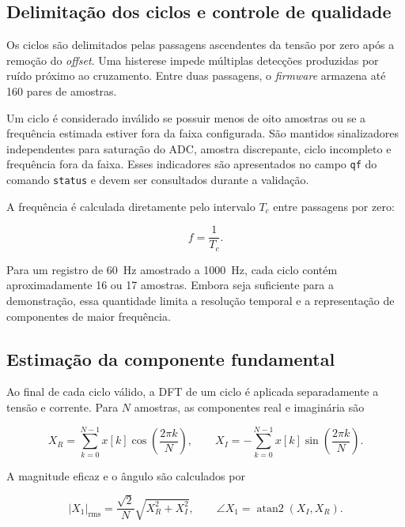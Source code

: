 \subsection{Delimitação dos ciclos e controle de qualidade}

Os ciclos são delimitados pelas passagens ascendentes da tensão por zero após a remoção do \textit{offset}. Uma histerese impede múltiplas detecções produzidas por ruído próximo ao cruzamento. Entre duas passagens, o \textit{firmware} armazena até 160 pares de amostras.

Um ciclo é considerado inválido se possuir menos de oito amostras ou se a frequência estimada estiver fora da faixa configurada. São mantidos sinalizadores independentes para saturação do ADC, amostra discrepante, ciclo incompleto e frequência fora da faixa. Esses indicadores são apresentados no campo \texttt{qf} do comando \texttt{status} e devem ser consultados durante a validação.

A frequência é calculada diretamente pelo intervalo $T_c$ entre passagens por zero:

\begin{equation}
  f=\frac{1}{T_c}.
\end{equation}

Para um registro de \SI{60}{\hertz} amostrado a \SI{1000}{\hertz}, cada ciclo contém aproximadamente 16 ou 17 amostras. Embora seja suficiente para a demonstração, essa quantidade limita a resolução temporal e a representação de componentes de maior frequência.

\subsection{Estimação da componente fundamental}

Ao final de cada ciclo válido, a DFT de um ciclo é aplicada separadamente a tensão e corrente. Para $N$ amostras, as componentes real e imaginária são

\begin{equation}
  X_R=\sum_{k=0}^{N-1}x[k]\cos\left(\frac{2\pi k}{N}\right), \qquad
  X_I=-\sum_{k=0}^{N-1}x[k]\sin\left(\frac{2\pi k}{N}\right).
\end{equation}

A magnitude eficaz e o ângulo são calculados por

\begin{equation}
  |X_1|_{\mathrm{rms}}=\frac{\sqrt{2}}{N}\sqrt{X_R^2+X_I^2}, \qquad
  \angle X_1=\operatorname{atan2}(X_I,X_R).
  \label{eq:dft-fundamental-implementacao}
\end{equation}

